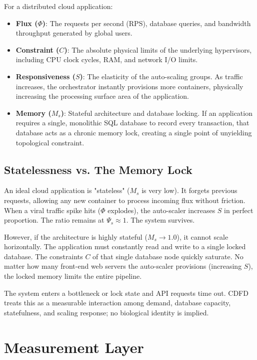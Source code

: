\documentclass[11pt,a4paper]{article}
\begin{document}
For a distributed cloud application:
\begin{itemize}
    \item \textbf{Flux ($\Phi$)}: The requests per second (RPS), database queries, and bandwidth throughput generated by global users.
    \item \textbf{Constraint ($C$)}: The absolute physical limits of the underlying hypervisors, including CPU clock cycles, RAM, and network I/O limits.
    \item \textbf{Responsiveness ($S$)}: The elasticity of the auto-scaling groups. As traffic increases, the orchestrator instantly provisions more containers, physically increasing the processing surface area of the application.
    \item \textbf{Memory ($M_s$)}: Stateful architecture and database locking. If an application requires a single, monolithic SQL database to record every transaction, that database acts as a chronic memory lock, creating a single point of unyielding topological constraint.
\end{itemize}

\subsection{Statelessness vs. The Memory Lock}
An ideal cloud application is "stateless" ($M_s$ is very low). It forgets previous requests, allowing any new container to process incoming flux without friction. When a viral traffic spike hits ($\Phi$ explodes), the auto-scaler increases $S$ in perfect proportion. The ratio remains at $\Psi_s \approx 1$. The system survives.

However, if the architecture is highly stateful ($M_s \to 1.0$), it cannot scale horizontally. The application must constantly read and write to a single locked database. The constraints $C$ of that single database node quickly saturate. No matter how many front-end web servers the auto-scaler provisions (increasing $S$), the locked memory limits the entire pipeline.

The system enters a bottleneck or lock state and API requests time out. CDFD treats this as a measurable interaction among demand, database capacity, statefulness, and scaling response; no biological identity is implied.



\section{Measurement Layer}
\end{document}

